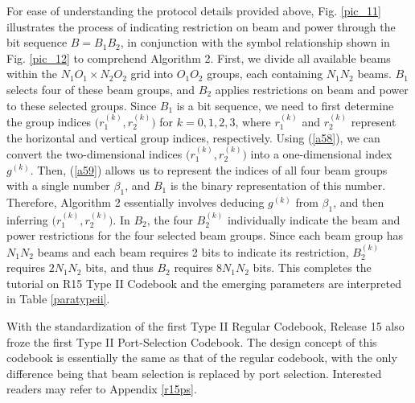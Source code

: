 \documentclass[lettersize,journal]{IEEEtran}
\begin{document}
For ease of understanding the protocol details provided above, Fig. \ref{pic_11} illustrates the process of indicating restriction on beam and power through the bit sequence \( B=B_1B_2\), in conjunction with the symbol relationship shown in Fig. \ref{pic_12} to comprehend Algorithm 2. First, we divide all available beams within the \( N_1O_1 \times N_2O_2 \) grid into \( O_1O_2 \) groups, each containing \( N_1N_2 \) beams. $B_1$ selects four of these beam groups, and $B_2$ applies restrictions on beam and power to these selected groups. Since $B_1$ is a bit sequence, we need to first determine the group indices $\big( {r_1^{\left( k \right)},r_2^{\left( k \right)}} \big)$ for \( k=0, 1, 2, 3 \), where \( r_1^{\left( k \right)} \) and \( r_2^{\left( k \right)}  \) represent the horizontal and vertical group indices, respectively. Using (\ref{a58}), we can convert the two-dimensional indices $\big( {r_1^{\left( k \right)},r_2^{\left( k \right)}} \big)$ into a one-dimensional index ${g^{\left( k \right)}}$. Then, (\ref{a59}) allows us to represent the indices of all four beam groups with a single number ${\beta _1}$, and $B_1$ is the binary representation of this number. Therefore, Algorithm 2 essentially involves deducing ${g^{\left( k \right)}}$ from ${\beta _1}$, and then inferring $\big( {r_1^{\left( k \right)},r_2^{\left( k \right)}} \big)$. In $B_2$, the four \( B_2^{(k)} \) individually indicate the beam and power restrictions for the four selected beam groups. Since each beam group has \( N_1N_2 \) beams and each beam requires 2 bits to indicate its restriction, \( B_2^{(k)} \) requires \( 2N_1N_2 \) bits, and thus $B_2$ requires \( 8N_1N_2 \) bits. This completes the tutorial on R15 Type II Codebook and the emerging parameters are interpreted in Table \ref{paratypeii}. 

With the standardization of the first Type II Regular Codebook, Release 15 also froze the first Type II Port-Selection Codebook. The design concept of this codebook is essentially the same as that of the regular codebook, with the only difference being that beam selection is replaced by port selection. Interested readers may refer to Appendix \ref{r15ps}.
\end{document}
